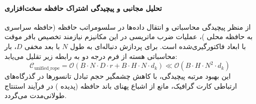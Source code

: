 \paragraph{تحلیل مجانبی و پیچیدگی اشتراک حافظه سخت‌افزاری}
از منظر پیچیدگی محاسباتی و انتقال داده‌ها در سلسومراتب حافظه (حافظه سراسری  به حافظه محلی )، عملیات ضرب ماتریسی در این مکانیزم نیازمند تخصیص بافر موقت با ابعاد فاکتورگیری‌شده است. برای پردازش دنباله‌ای به طول $N$ با بعد مخفی $D$، بار محاسباتی هسته از فرم درجه دو به رابطه زیر تقلیل می‌یابد:
\begin{equation}
\label{eq:complexity_unified_rope}
\mathcal{C}_{\text{unified\_rope}} = \mathcal{O}\left( B \cdot N \cdot D \cdot r + B \cdot H \cdot N \cdot d_k \right) \ll \mathcal{O}\left( B \cdot H \cdot N^2 \cdot d_k \right)
\end{equation}
این بهبود مرتبه پیچیدگی، با کاهش چشمگیر حجم تبادل تانسورها در گذرگاه‌های ارتباطی کارت گرافیک، مانع از اشباع پهنای باند حافظه (پدیده ) در فرآیند استنتاج طولانی‌مدت می‌گردد.